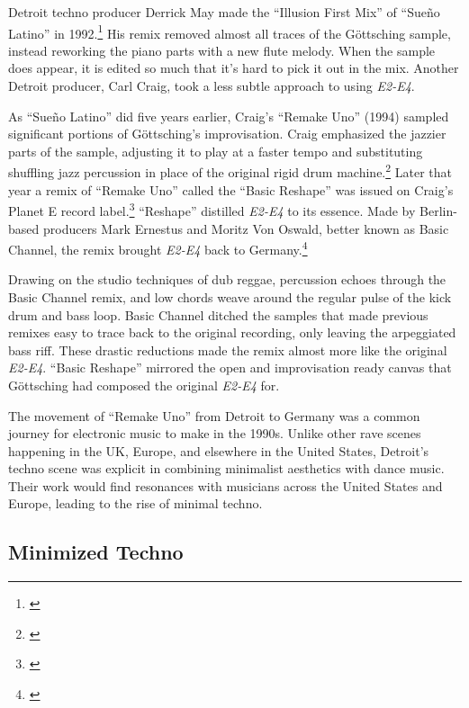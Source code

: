 \documentclass[12pt,twoside]{reedthesis}
\begin{document}
Detroit techno producer Derrick May made the ``Illusion First Mix'' of ``Sue{\~n}o Latino'' in 1992.\footnote{\cite{suenolatinoSuenoLatinoDerrick1992}} His remix removed almost all traces of the G{\"o}ttsching sample, instead reworking the piano parts with a new flute melody. When the sample does appear, it is edited so much that it's hard to pick it out in the mix. Another Detroit producer, Carl Craig, took a less subtle approach to using \emph{E2-E4}.

As ``Sue{\~n}o Latino'' did five years earlier, Craig's ``Remake Uno'' (1994) sampled significant portions of G{\"o}ttsching's improvisation. Craig emphasized the jazzier parts of the sample, adjusting it to play at a faster tempo and substituting shuffling jazz percussion in place of the original rigid drum machine.\footnote{\cite{paperclippeopleRemake1994}} Later that year a remix of ``Remake Uno'' called the ``Basic Reshape'' was issued on Craig's Planet E record label.\footnote{\cite{paperclippeopleRemakeBasicReshape1994}} ``Reshape'' distilled \emph{E2-E4} to its essence. Made by Berlin-based producers Mark Ernestus and Moritz Von Oswald, better known as Basic Channel, the remix brought \emph{E2-E4} back to Germany.\footnote{\cite{mcdermottLabelMonthBasic2018}}

Drawing on the studio techniques of dub reggae, percussion echoes through the Basic Channel remix, and low chords weave around the regular pulse of the kick drum and bass loop. Basic Channel ditched the samples that made previous remixes easy to trace back to the original recording, only leaving the arpeggiated bass riff. These drastic reductions made the remix almost more like the original \emph{E2-E4}. ``Basic Reshape'' mirrored the open and improvisation ready canvas that G{\"o}ttsching had composed the original \emph{E2-E4} for.

The movement of ``Remake Uno'' from Detroit to Germany was a common journey for electronic music to make in the 1990s. Unlike other rave scenes happening in the UK, Europe, and elsewhere in the United States, Detroit's techno scene was explicit in combining minimalist aesthetics with dance music. Their work would find resonances with musicians across the United States and Europe, leading to the rise of minimal techno.

\subsection{Minimized Techno}
\end{document}
